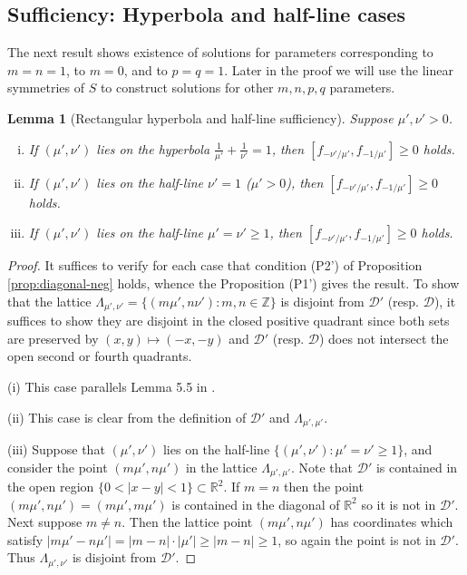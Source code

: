 \documentclass[11pt, letterpaper, reqno]{amsart}
\newtheorem{lem}[thm]{Lemma}
\theoremstyle{definition}
\theoremstyle{remark}
\numberwithin{equation}{section}
\newcommand{\RR}{\ensuremath{\mathbb{R}}}
\newcommand{\ZZ}{\ensuremath{\mathbb{Z}}}
\newcommand{\uu}{{\mu'}}
\newcommand{\vv}{{\nu'}}
\newcommand{\cD}{\mathcal{D}}
\newcommand{\cDprime}{{\mathcal{D}'}}
\begin{document}
\subsection{Sufficiency: Hyperbola and half-line cases}
\label{sec:neg-lattice-disjointness}

The next result  shows existence of solutions for parameters corresponding to $m=n=1$,
to $m=0$,
and to $p=q=1$. 
Later in the proof we will use the linear  symmetries of $S$ to construct solutions for other 
$m,n,p,q$ parameters.

\begin{lem}[Rectangular hyperbola and half-line sufficiency]
\label{lem:hyperbola-neg}
Suppose $\uu, \vv > 0$. 
\begin{enumerate}[(i)]
\item
If  $(\uu,\vv)$ lies on the hyperbola $\frac{1}{\uu} + \frac{1}{\vv} = 1$,
 then 
 $[f_{-\vv/\uu}, f_{-1/\uu}] \geq 0$  holds.
\item 
If $(\uu, \vv)$ lies on the half-line $\vv=1$
($\uu >0$),
then $[f_{-\vv/\uu}, f_{-1/\uu}] \geq 0$  holds.
\item
If  $(\uu,\vv)$ lies on the half-line ${\uu} = {\vv} \geq 1$,
then 
$[f_{-\vv/\uu}, f_{-1/\uu}] \geq 0$  holds.
\end{enumerate}
\end{lem}

\begin{proof}
It suffices to verify for each case  that condition  (P2') of Proposition \ref{prop:diagonal-neg}
holds, whence the Proposition (P1') gives the result. 
To show that the lattice $\Lambda_{\uu,\vv} = \{ (m\uu, n\vv) : m,n \in\ZZ \}$ is disjoint from $\cDprime$
(resp. $\cD$), 
it suffices to show they are disjoint in the closed positive quadrant 
since both sets are preserved by 
$(x,y) \mapsto (-x,-y)$ and $\cDprime$ (resp. $\cD$)
does not intersect the open second or fourth quadrants.

(i) This case  parallels  Lemma 5.5 in  \cite{LagR:2018a}.

(ii) This case is clear from the definition of $\cDprime$ and $\Lambda_{\uu,\uu}$.

(iii) Suppose that $(\uu,\vv)$ lies on the half-line $\{(\uu,\vv) : \uu=\vv \geq1\}$, 
and consider the point $(m\uu, n\uu)$ in the lattice $\Lambda_{\uu,\uu}$.
Note that $\cDprime$ is contained in the open region $\{ 0 < |x - y| < 1 \}\subset \RR^2$. 
If ${ m=n }$ then the point $(m\uu, n\uu)=(m \uu, m\uu)$
is contained in the diagonal of $\RR^2$ so it is not in $\cDprime$. 
Next suppose $m\neq n$. 
Then the lattice point $(m\uu, n\uu)$ has coordinates which satisfy 
$|m\uu-n\uu|  = |m-n|\cdot |\uu| \geq |m-n| \geq 1$, 
so  again the point is not in $\cDprime$.
Thus $\Lambda_{\uu,\vv}$ is disjoint from $\cDprime$.
\end{proof}
\end{document}
